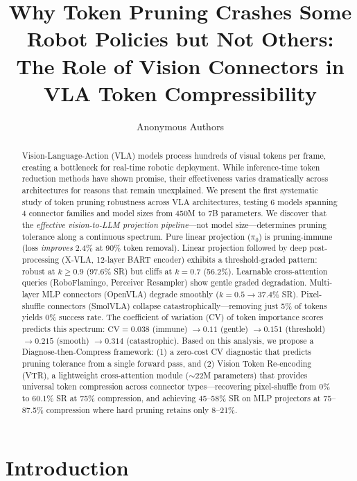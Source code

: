 \documentclass[letterpaper]{article}
\title{Why Token Pruning Crashes Some Robot Policies but Not Others:\\The Role of Vision Connectors in VLA Token Compressibility}
\author[1]{Anonymous Authors}
\affil[1]{Anonymous Institution}
\date{}
\begin{document}
\maketitle

\begin{abstract}
Vision-Language-Action (VLA) models process hundreds of visual tokens per frame, creating a bottleneck for real-time robotic deployment. While inference-time token reduction methods have shown promise, their effectiveness varies dramatically across architectures for reasons that remain unexplained. We present the first systematic study of token pruning robustness across VLA architectures, testing 6 models spanning 4 connector families and model sizes from 450M to 7B parameters. We discover that the \emph{effective vision-to-LLM projection pipeline}---not model size---determines pruning tolerance along a continuous spectrum. Pure linear projection ($\pi_0$) is pruning-immune (loss \emph{improves} 2.4\% at 90\% token removal). Linear projection followed by deep post-processing (X-VLA, 12-layer BART encoder) exhibits a threshold-graded pattern: robust at $k \geq 0.9$ (97.6\% SR) but cliffs at $k=0.7$ (56.2\%). Learnable cross-attention queries (RoboFlamingo, Perceiver Resampler) show gentle graded degradation. Multi-layer MLP connectors (OpenVLA) degrade smoothly ($k=0.5 \to 37.4\%$ SR). Pixel-shuffle connectors (SmolVLA) collapse catastrophically---removing just 5\% of tokens yields 0\% success rate. The coefficient of variation (CV) of token importance scores predicts this spectrum: $\text{CV} = 0.038$ (immune) $\to 0.11$ (gentle) $\to 0.151$ (threshold) $\to 0.215$ (smooth) $\to 0.314$ (catastrophic). Based on this analysis, we propose a Diagnose-then-Compress framework: (1) a zero-cost CV diagnostic that predicts pruning tolerance from a single forward pass, and (2) Vision Token Re-encoding (VTR), a lightweight cross-attention module ($\sim$22M parameters) that provides universal token compression across connector types---recovering pixel-shuffle from 0\% to 60.1\% SR at 75\% compression, and achieving 45--58\% SR on MLP projectors at 75--87.5\% compression where hard pruning retains only 8--21\%.
\end{abstract}

\section{Introduction}
\end{document}
